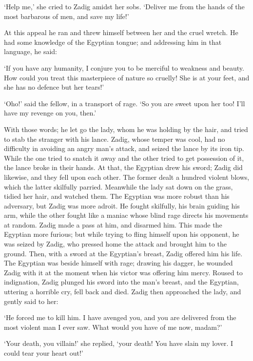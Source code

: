 \documentclass{article}
\begin{document}
\begin{center}
`Help me,' she cried to Zadig amidst her sobs. `Deliver me from the hands of the 
most barbarous of men, and save my life!' 

At this appeal he ran and threw himself between her and the cruel wretch. He had 
some knowledge of the Egyptian tongue; and addressing him in that language, he 
said: 

`If you have any humanity, I conjure you to be merciful to weakness and beauty. 
How could you treat this masterpiece of nature so cruelly! She is at your feet, 
and she has no defence but her tears!' 

`Oho!' said the fellow, in a transport of rage. `So you are sweet upon her too! 
I'll have my revenge on you, then.' 

With those words; he let go the lady, whom he was holding by the hair, and tried 
to stab the stranger with his lance. Zadig, whose temper was cool, had no difficulty 
in avoiding an angry man's attack, and seized the lance by its iron tip. While 
the one tried to snatch it away and the other tried to get possession of it, the 
lance broke in their hands. At that, the Egyptian drew his sword; Zadig did likewise, 
and they fell upon each other. The former dealt a hundred violent blows, which 
the latter skilfully parried. Meanwhile the lady sat down on the grass, tidied 
her hair, and watched them. The Egyptian was more robust than his adversary, but 
Zadig was more adroit. He fought skilfully, his brain guiding his arm, while the 
other fought like a maniac whose blind rage directs his movements at random. Zadig 
made a pass at him, and disarmed him. This made the Egyptian more furious; but 
while trying to fling himself upon his opponent, he was seized by Zadig, who pressed 
home the attack and brought him to the ground. Then, with a sword at the Egyptian's 
breast, Zadig offered him his life. The Egyptian was beside himself with rage; 
drawing his dagger, he wounded Zadig with it at the moment when his victor was 
offering him mercy. Roused to indignation, Zadig plunged his sword into the man's 
breast, and the Egyptian, uttering a horrible cry, fell back and died. Zadig then 
approached the lady, and gently said to her: 

`He forced me to kill him. I have avenged you, and you are delivered from the most 
violent man I ever saw. What would you have of me now, madam?' 

`Your death, you villain!' she replied, `your death! You have slain my lover. I 
could tear your heart out!' 


\end{center}
\end{document}
